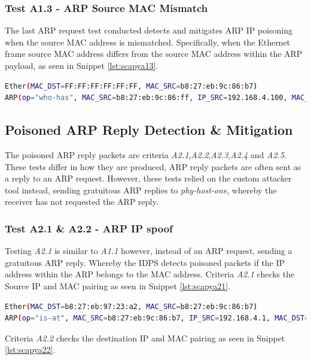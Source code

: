 \documentclass[12pt, oneside]{book}
\begin{document}
\subsubsection{Test A1.3 - ARP Source MAC Mismatch}
The last ARP request test conducted detects and mitigates ARP IP poisoning when the 
source MAC address is mismatched. Specifically, when the Ethernet frame source MAC address differs from the 
source MAC address within the ARP payload, as seen in Snippet \ref{lst:scapya13}.
\begin{lstlisting}[language=Bash,caption={Scapy A1.3 Test},captionpos=b,label={lst:scapya13}]
Ether(MAC_DST=FF:FF:FF:FF:FF:FF, MAC_SRC=b8:27:eb:9c:86:b7)
ARP(op="who-has", MAC_SRC=b8:27:eb:9c:86:ff, IP_SRC=192.168.4.100, MAC_DST=FF:FF:FF:FF:FF:FF, IP_DST=192.168.4.50)
\end{lstlisting}


\subsection{Poisoned ARP Reply Detection \& Mitigation}
The poisoned ARP reply packets are criteria \emph{A2.1},\emph{A2.2},\emph{A2.3},\emph{A2.4} and \emph{A2.5}.
These tests differ in how they are produced, ARP reply packets are often sent as a reply to an ARP request.
However, these tests relied on the custom attacker tool instead, sending gratuitous ARP replies to \emph{phy-host-one},
whereby the receiver has not requested the ARP reply.

\subsubsection{Test A2.1 \& A2.2 - ARP IP spoof}
Testing \emph{A2.1} is similar to \emph{A1.1} however, instead of an ARP request, sending a gratuitous ARP reply. Whereby 
the IDPS detects poisoned packets if the IP address within the ARP belongs to the MAC address. Criteria \emph{A2.1} checks the
Source IP and MAC pairing as seen in Snippet \ref{lst:scapya21}.

\begin{lstlisting}[language=Bash,caption={Scapy a25.1 Test},captionpos=b,label={lst:scapya21}]
Ether(MAC_DST=b8:27:eb:97:23:a2, MAC_SRC=b8:27:eb:9c:86:b7)
ARP(op="is-at", MAC_SRC=b8:27:eb:9c:86:b7, IP_SRC=192.168.4.1, MAC_DST=b8:27:eb:97:23:a2, IP_DST=192.168.4.50)
\end{lstlisting}

Criteria \emph{A2.2} 
checks the destination IP and MAC pairing as seen in Snippet \ref{lst:scapya22}.
\end{document}
